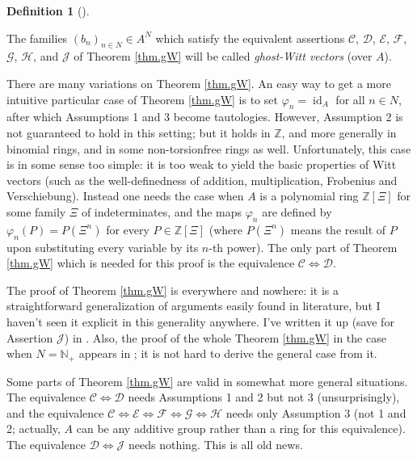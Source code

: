 \documentclass[numbers=enddot,12pt,final,onecolumn,notitlepage]{scrartcl}%
\theoremstyle{definition}
\newtheorem{defi}[theo]{Definition}
\newenvironment{definition}[1][]
{\begin{defi}[#1]\begin{leftbar}}
{\end{leftbar}\end{defi}}
\begin{document}
\begin{definition}
The families $\left(  b_{n}\right)  _{n\in N}\in A^{N}$ which satisfy the
equivalent assertions $\mathcal{C}$, $\mathcal{D}$, $\mathcal{E}$,
$\mathcal{F}$, $\mathcal{G}$, $\mathcal{H}$, and $\mathcal{J}$ of Theorem
\ref{thm.gW} will be called \textit{ghost-Witt vectors} (over $A$).
\end{definition}

There are many variations on Theorem \ref{thm.gW}. An easy way to get a more
intuitive particular case of Theorem \ref{thm.gW} is to set $\varphi
_{n}=\operatorname*{id}\nolimits_{A}$ for all $n\in N$, after which
Assumptions 1 and 3 become tautologies. However, Assumption 2 is not
guaranteed to hold in this setting; but it holds in $\mathbb{Z}$, and more
generally in binomial rings, and in some non-torsionfree rings as well.
Unfortunately, this case is in some sense too simple: it is too weak to yield
the basic properties of Witt vectors (such as the well-definedness of
addition, multiplication, Frobenius and Verschiebung). Instead one needs the
case when $A$ is a polynomial ring $\mathbb{Z}\left[  \Xi\right]  $ for some
family $\Xi$ of indeterminates, and the maps $\varphi_{n}$ are defined by
$\varphi_{n}\left(  P\right)  =P\left(  \Xi^{n}\right)  $ for every
$P\in\mathbb{Z}\left[  \Xi\right]  $ (where $P\left(  \Xi^{n}\right)  $ means
the result of $P$ upon substituting every variable by its $n$-th power). The
only part of Theorem \ref{thm.gW} which is needed for this proof is the
equivalence $\mathcal{C}\Longleftrightarrow\mathcal{D}$.

The proof of Theorem \ref{thm.gW} is everywhere and nowhere: it is a
straightforward generalization of arguments easily found in literature, but I
haven't seen it explicit in this generality anywhere. I've written it up (save
for Assertion $\mathcal{J}$) in \cite[Theorem 11]{dg-witt5}. Also, the proof
of the whole Theorem \ref{thm.gW} in the case when $N=\mathbb{N}_{+}$ appears
in \cite[Exercise 2.83]{reiner-hopf}; it is not hard to derive the general
case from it.

Some parts of Theorem \ref{thm.gW} are valid in somewhat more general
situations. The equivalence $\mathcal{C}\Longleftrightarrow\mathcal{D}$ needs
Assumptions 1 and 2 but not 3 (unsurprisingly), and the equivalence
$\mathcal{C}\Longleftrightarrow\mathcal{E}\Longleftrightarrow\mathcal{F}%
\Longleftrightarrow\mathcal{G}\Longleftrightarrow\mathcal{H}$ needs only
Assumption 3 (not 1 and 2; actually, $A$ can be any additive group rather than
a ring for this equivalence). The equivalence $\mathcal{D}\Longleftrightarrow
\mathcal{J}$ needs nothing. This is all old news.
\end{document}
